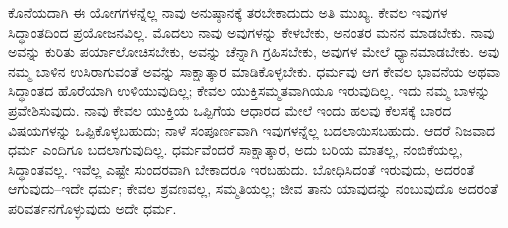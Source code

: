 ಕೊನೆಯದಾಗಿ ಈ ಯೋಗಗಳನ್ನೆಲ್ಲ ನಾವು ಅನುಷ್ಠಾನಕ್ಕೆ ತರಬೇಕಾದುದು ಅತಿ ಮುಖ್ಯ. ಕೇವಲ ಇವುಗಳ ಸಿದ್ಧಾಂತದಿಂದ ಪ್ರಯೋಜನವಿಲ್ಲ. ಮೊದಲು ನಾವು ಅವುಗಳನ್ನು ಕೇಳಬೇಕು, ಅನಂತರ ಮನನ ಮಾಡಬೇಕು. ನಾವು ಅವನ್ನು ಕುರಿತು ಪರ್ಯಾಲೋಚಿಸಬೇಕು, ಅವನ್ನು ಚೆನ್ನಾಗಿ ಗ್ರಹಿಸಬೇಕು, ಅವುಗಳ ಮೇಲೆ ಧ್ಯಾನಮಾಡಬೇಕು. ಅವು ನಮ್ಮ ಬಾಳಿನ ಉಸಿರಾಗುವಂತೆ ಅವನ್ನು ಸಾಕ್ಷಾತ್ಕಾರ ಮಾಡಿಕೊಳ್ಳಬೇಕು. ಧರ್ಮವು ಆಗ ಕೇವಲ ಭಾವನೆಯ ಅಥವಾ ಸಿದ್ಧಾಂತದ ಹೊರೆಯಾಗಿ ಉಳಿಯುವುದಿಲ್ಲ; ಕೇವಲ ಯುಕ್ತಿಸಮ್ಮತವಾಗಿಯೂ ಇರುವುದಿಲ್ಲ. ಇದು ನಮ್ಮ ಬಾಳನ್ನು ಪ್ರವೇಶಿಸುವುದು. ನಾವು ಕೇವಲ ಯುಕ್ತಿಯ ಒಪ್ಪಿಗೆಯ ಆಧಾರದ ಮೇಲೆ ಇಂದು ಹಲವು ಕೆಲಸಕ್ಕೆ ಬಾರದ ವಿಷಯಗಳನ್ನು ಒಪ್ಪಿಕೊಳ್ಳಬಹುದು; ನಾಳೆ ಸಂಪೂರ್ಣವಾಗಿ ಇವುಗಳನ್ನೆಲ್ಲ ಬದಲಾಯಿಸಬಹುದು. ಆದರೆ ನಿಜವಾದ ಧರ್ಮ ಎಂದಿಗೂ ಬದಲಾಗುವುದಿಲ್ಲ. ಧರ್ಮವೆಂದರೆ ಸಾಕ್ಷಾತ್ಕಾರ, ಅದು ಬರಿಯ ಮಾತಲ್ಲ, ನಂಬಿಕೆಯಲ್ಲ, ಸಿದ್ಧಾಂತವಲ್ಲ. ಇವೆಲ್ಲ ಎಷ್ಟೇ ಸುಂದರವಾಗಿ ಬೇಕಾದರೂ ಇರಬಹುದು. ಬೋಧಿಸಿದಂತೆ ಇರುವುದು, ಅದರಂತೆ ಆಗುವುದು–ಇದೇ ಧರ್ಮ; ಕೇವಲ ಶ್ರವಣವಲ್ಲ, ಸಮ್ಮತಿಯಲ್ಲ; ಜೀವ ತಾನು ಯಾವುದನ್ನು ನಂಬುವುದೊ ಅದರಂತೆ ಪರಿವರ್ತನಗೊಳ್ಳುವುದು ಅದೇ ಧರ್ಮ.

